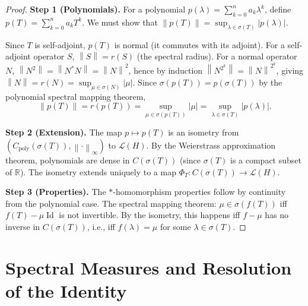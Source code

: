 \documentclass[a4paper,12pt]{book}
\DeclareMathOperator{\Id}{Id}
\newcommand{\R}{\mathbb{R}}
\newcommand{\norm}[1]{\left\| #1 \right\|}
\newcommand{\abs}[1]{\left| #1 \right|}
\theoremstyle{definition}
\theoremstyle{plain}
\theoremstyle{remark}
\begin{document}
\begin{proof}
\textbf{Step 1 (Polynomials).} For a polynomial $p(\lambda) = \sum_{k=0}^n a_k \lambda^k$,
define $p(T) = \sum_{k=0}^n a_k T^k$. We must show that
$\norm{p(T)} = \sup_{\lambda \in \sigma(T)} \abs{p(\lambda)}$.

Since $T$ is self-adjoint, $p(T)$ is normal (it commutes with its adjoint).
For a self-adjoint operator $S$, $\norm{S} = r(S)$ (the spectral radius).
For a normal operator $N$, $\norm{N^2} = \norm{N^*N} = \norm{N}^2$, hence
by induction $\norm{N^{2^k}} = \norm{N}^{2^k}$, giving
$\norm{N} = r(N) = \sup_{\mu \in \sigma(N)} \abs{\mu}$.
Since $\sigma(p(T)) = p(\sigma(T))$ by the polynomial spectral mapping theorem,
\[
  \norm{p(T)} = r(p(T)) = \sup_{\mu \in \sigma(p(T))} \abs{\mu}
  = \sup_{\lambda \in \sigma(T)} \abs{p(\lambda)}.
\]

\textbf{Step 2 (Extension).} The map $p \mapsto p(T)$ is an isometry from
$(C_{\mathrm{poly}}(\sigma(T)), \norm{\cdot}_\infty)$ to $\mathcal{L}(H)$.
By the Weierstrass approximation theorem,
polynomials are dense in $C(\sigma(T))$ (since $\sigma(T)$ is a compact subset
of $\R$). The isometry extends uniquely to a map
$\Phi_T \colon C(\sigma(T)) \to \mathcal{L}(H)$.

\textbf{Step 3 (Properties).} The $*$-homomorphism properties follow by
continuity from the polynomial case. The spectral mapping theorem:
$\mu \in \sigma(f(T))$ iff $f(T) - \mu\Id$ is not invertible. By the
isometry, this happens iff $f - \mu$ has no inverse in $C(\sigma(T))$,
i.e., iff $f(\lambda) = \mu$ for some $\lambda \in \sigma(T)$.
\end{proof}


\section{Spectral Measures and Resolution of the Identity}
\label{sec:spectral-measures}

\end{document}
